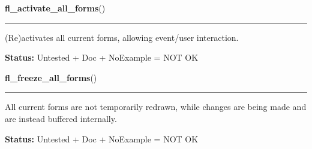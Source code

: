     \label{xformslib:library:fl_activate_all_forms}

    \vspace{0.5ex}

\hspace{.8\funcindent}\begin{boxedminipage}{\funcwidth}

    \raggedright \textbf{fl\_activate\_all\_forms}()

    \vspace{-1.5ex}

    \rule{\textwidth}{0.5\fboxrule}
\setlength{\parskip}{2ex}
    (Re)activates all current forms, allowing event/user interaction.

\setlength{\parskip}{1ex}
\textbf{Status:} Untested + Doc + NoExample = NOT OK



    \end{boxedminipage}

    \label{xformslib:library:fl_freeze_all_forms}

    \vspace{0.5ex}

\hspace{.8\funcindent}\begin{boxedminipage}{\funcwidth}

    \raggedright \textbf{fl\_freeze\_all\_forms}()

    \vspace{-1.5ex}

    \rule{\textwidth}{0.5\fboxrule}
\setlength{\parskip}{2ex}
    All current forms are not temporarily redrawn, while changes are being 
    made and are instead buffered internally.

\setlength{\parskip}{1ex}
\textbf{Status:} Untested + Doc + NoExample = NOT OK



    \end{boxedminipage}

    \label{xformslib:library:fl_unfreeze_all_forms}

    \vspace{0.5ex}

